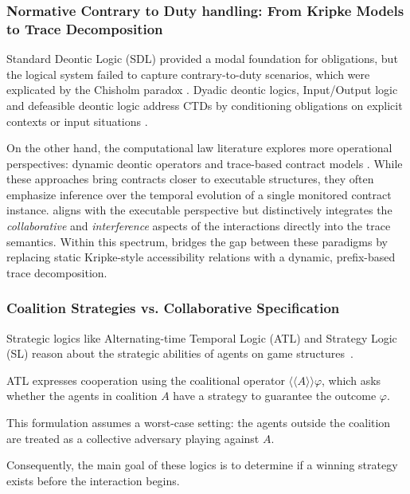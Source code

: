 \subsubsection{Normative Contrary to Duty handling: From Kripke Models to Trace Decomposition}

Standard Deontic Logic (SDL) provided a modal foundation for obligations, but the logical system failed to capture contrary-to-duty scenarios, which were explicated by the Chisholm paradox \cite{VonWright1951,Chisholm1963,carmo2001deontic}. Dyadic deontic logics, Input/Output logic and defeasible deontic logic address CTDs by conditioning obligations on explicit contexts or input situations \cite{DBLP:conf/deon/BenzmullerFP18,Makinson2000}.

On the other hand, the computational law literature explores more operational perspectives: dynamic deontic operators and trace-based contract models \cite{PrisacariuS12,HvitvedKZ12,wyner2006sequences}. While these approaches bring contracts closer to executable structures, they often emphasize inference over the temporal evolution of a single monitored contract instance. \cDL aligns with the executable perspective but distinctively integrates the \emph{collaborative} and \emph{interference} aspects of the interactions directly into the trace semantics. Within this spectrum, \cDL bridges the gap between these paradigms by replacing static Kripke-style accessibility relations with a dynamic, prefix-based trace decomposition.


\subsubsection{Coalition Strategies vs. Collaborative Specification}

Strategic logics like Alternating-time Temporal Logic (ATL) and Strategy Logic (SL) reason about the strategic abilities of agents on game structures~\cite{Alur2002,Chatterjee2010,bulling2015strategic,belardinelli2015logic,caltais2014mcmas}.

ATL expresses cooperation using the coalitional operator $\langle\langle A \rangle\rangle \varphi$, which asks whether the agents in coalition $A$ have a strategy to guarantee the outcome $\varphi$.

This formulation assumes a worst-case setting: the agents outside the coalition are treated as a collective adversary playing against $A$.

Consequently, the main goal of these logics is to determine if a winning strategy exists before the interaction begins.

